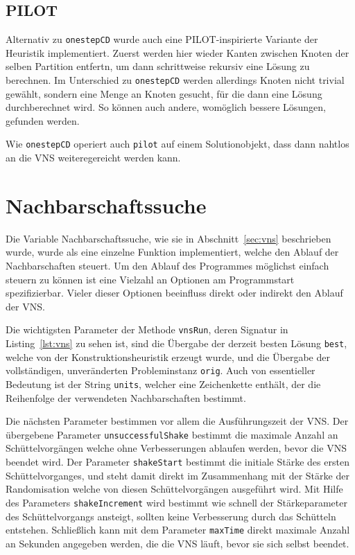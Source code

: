 \subsection{PILOT}
Alternativ zu \texttt{onestepCD} wurde auch eine PILOT-inspirierte Variante der Heuristik implementiert. Zuerst werden hier wieder Kanten zwischen Knoten der selben Partition entfertn, um dann schrittweise rekursiv eine Lösung zu berechnen. Im Unterschied zu \texttt{onestepCD} werden allerdings Knoten nicht trivial gewählt, sondern eine Menge an Knoten gesucht, für die dann eine Lösung durchberechnet wird. So können auch andere, womöglich bessere Lösungen, gefunden werden.

Wie \texttt{onestepCD} operiert auch \texttt{pilot} auf einem Solutionobjekt, dass dann nahtlos an die VNS weiteregereicht werden kann.

\section{Nachbarschaftssuche}
\label{sec:impl:vns}

Die Variable Nachbarschaftssuche, wie sie in Abschnitt~\ref{sec:vns} beschrieben wurde, wurde als eine einzelne Funktion implementiert, welche den Ablauf der Nachbarschaften steuert. Um den Ablauf des Programmes
möglichst einfach steuern zu können ist eine Vielzahl an Optionen am Programmstart spezifizierbar. Vieler dieser Optionen beeinfluss direkt oder indirekt den Ablauf der VNS. 

Die wichtigsten Parameter der Methode \texttt{vnsRun}, deren Signatur in Listing~\ref{lst:vns} zu sehen ist, sind die Übergabe der derzeit besten Lösung \texttt{best}, welche von der Konstruktionsheuristik erzeugt wurde, und
die Übergabe der vollständigen, unveränderten Probleminstanz \texttt{orig}. Auch von essentieller Bedeutung ist der String \texttt{units}, welcher eine Zeichenkette enthält, der die Reihenfolge der verwendeten Nachbarschaften bestimmt. 

Die nächsten Parameter bestimmen vor allem die Ausführungszeit der VNS. Der übergebene Parameter \texttt{unsuccessfulShake} bestimmt die maximale Anzahl an Schüttelvorgängen welche ohne Verbesserungen ablaufen werden, bevor die VNS beendet wird.
Der Parameter \texttt{shakeStart} bestimmt die initiale Stärke des ersten Schüttelvorganges, und steht damit direkt im Zusammenhang mit der Stärke der Randomisation welche von diesen Schüttelvorgängen ausgeführt wird.
Mit Hilfe des Parameters \texttt{shakeIncrement} wird bestimmt wie schnell der Stärkeparameter des Schüttelvorgangs ansteigt, sollten keine Verbesserung durch das Schütteln entstehen.
Schließlich kann mit dem Parameter \texttt{maxTime} direkt maximale Anzahl an Sekunden angegeben werden, die die VNS läuft, bevor sie sich selbst beendet. 

